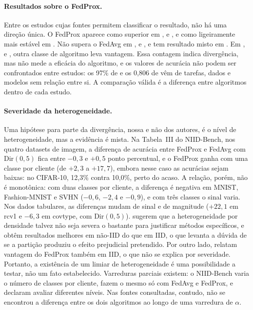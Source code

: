 \paragraph{Resultados sobre o FedProx.}
Entre os estudos cujas fontes permitem classificar o resultado, não há uma direção única. O FedProx aparece como superior em \citet{mahmood2025alzheimer}, \citet{delehouzee2024crosssilo} e \citet{julekha2026bangla}, e como ligeiramente mais estável em \citet{sevinc2025distribution}. Não supera o FedAvg em \citet{vajjhula2025har}, \citet{quintana2026mammography} e \citet{marella2025fedonco}, e tem resultado misto em \citet{tan2026instruction}. Em \citet{enang2026optimiser}, \citet{carranco2025adhoc} e \citet{mim2025healthcare}, outra classe de algoritmo leva vantagem. Essa contagem indica divergência, mas não mede a eficácia do algoritmo, e os valores de acurácia não podem ser confrontados entre estudos: os 97\% de \citet{vajjhula2025har} e os 0,806 de \citet{mahmood2025alzheimer} vêm de tarefas, dados e modelos sem relação entre si. A comparação válida é a diferença entre algoritmos dentro de cada estudo.

\paragraph{Severidade da heterogeneidade.}
Uma hipótese para parte da divergência, nossa e não dos autores, é o nível de heterogeneidade, mas a evidência é mista. Na Tabela~III do NIID-Bench, nos quatro datasets de imagem, a diferença de acurácia entre FedProx e FedAvg com $\mathrm{Dir}(0{,}5)$ fica entre $-0{,}3$ e $+0{,}5$ ponto percentual, e o FedProx ganha com uma classe por cliente (de $+2{,}3$ a $+17{,}7$), embora nesse caso as acurácias sejam baixas: no CIFAR-10, 12,3\% contra 10,0\%, perto do acaso. A relação, porém, não é monotônica: com duas classes por cliente, a diferença é negativa em MNIST, Fashion-MNIST e SVHN ($-0{,}6$, $-2{,}4$ e $-0{,}9$), e com três classes o sinal varia. Nos dados tabulares, as diferenças mudam de sinal e de magnitude ($+22{,}1$ em rcv1 e $-6{,}3$ em covtype, com $\mathrm{Dir}(0{,}5)$). \citet{quintana2026mammography} sugerem que a heterogeneidade por densidade talvez não seja severa o bastante para justificar métodos específicos, e \citet{vajjhula2025har} obtêm resultados melhores em não-IID do que em IID, o que levanta a dúvida de se a partição produziu o efeito prejudicial pretendido. Por outro lado, \citet{julekha2026bangla} relatam vantagem do FedProx também em IID, o que não se explica por severidade. Portanto, a existência de um limiar de heterogeneidade é uma possibilidade a testar, não um fato estabelecido. Varreduras parciais existem: o NIID-Bench varia o número de classes por cliente, \citet{ananouch2025optimization} fazem o mesmo só com FedAvg e FedProx, e \citet{mora2022empirical} declaram avaliar diferentes níveis. Nas fontes consultadas, contudo, não se encontrou a diferença entre os dois algoritmos ao longo de uma varredura de $\alpha$.

